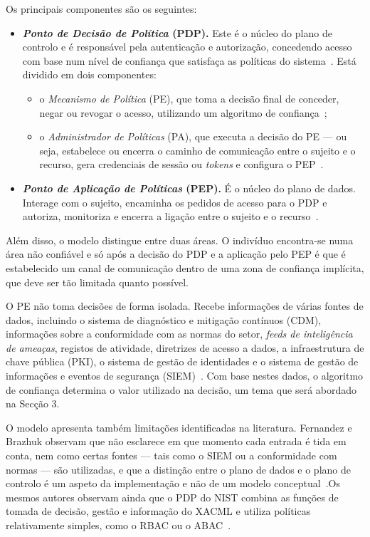 \documentclass{llncs}
\begin{document}
Os principais componentes são os seguintes:

\begin{itemize}
  \item \textbf{\textit{Ponto de Decisão de Política} (PDP).} Este é o núcleo do
  plano de controlo e é responsável pela autenticação e autorização, concedendo acesso
  com base num nível de confiança que satisfaça as políticas do sistema~\cite{kang2023}. Está dividido
  em dois componentes:
  \begin{itemize}
    \item o \textit{Mecanismo de Política} (PE), que toma a decisão final de conceder,
    negar ou revogar o acesso, utilizando um algoritmo de confiança~\cite{fernandez2024};
    \item o \textit{Administrador de Políticas} (PA), que executa a decisão do PE — ou seja,
    estabelece ou encerra o caminho de comunicação entre o sujeito e o recurso, gera
    credenciais de sessão ou \textit{tokens} e configura o PEP~\cite{dhiman2024}.
  \end{itemize}
  \item \textbf{\textit{Ponto de Aplicação de Políticas} (PEP).} É o núcleo do
  plano de dados. Interage com o sujeito, encaminha os pedidos de acesso para o PDP e autoriza,
  monitoriza e encerra a ligação entre o sujeito e o recurso~\cite{kang2023,dhiman2024}.
\end{itemize}

Além disso, o modelo distingue entre duas áreas. O indivíduo encontra-se numa área não confiável e só após a decisão do PDP e a aplicação pelo PEP é que é estabelecido um canal de comunicação dentro de uma zona de confiança implícita, que deve ser tão limitada quanto possível.  

O PE não toma decisões de forma isolada. Recebe informações de várias fontes de dados, incluindo
o sistema de diagnóstico e mitigação contínuos (CDM), informações sobre a conformidade
com as normas do setor, \textit{feeds de inteligência de ameaças}, registos de atividade, diretrizes de acesso a dados, a infraestrutura de chave pública (PKI),
o sistema de gestão de identidades e o sistema de gestão de informações e eventos de segurança
(SIEM)~\cite{fernandez2024,dhiman2024}. Com base nestes dados, o
algoritmo de confiança determina o valor utilizado na decisão, um tema que será abordado
na Secção 3.

O modelo apresenta também limitações identificadas na literatura. Fernandez e Brazhuk
observam que não esclarece em que momento cada entrada é tida em conta, nem como
certas fontes — tais como o SIEM ou a conformidade com normas — são utilizadas, e que a
distinção entre o plano de dados e o plano de controlo é um aspeto da implementação e
não de um modelo conceptual~\cite{fernandez2024}.Os mesmos autores observam ainda que o PDP do NIST combina
as funções de tomada de decisão, gestão e informação do XACML e utiliza
políticas relativamente simples, como o RBAC ou o ABAC~\cite{fernandez2024}.
\end{document}
